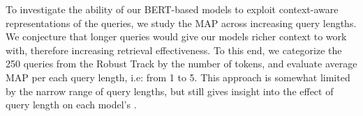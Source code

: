 \begin{table*}[b!]
\caption{}
\label{tab:results-query-length}
\end{table*}

To investigate the ability of our BERT-based models to exploit context-aware representations of the queries, we study the MAP across increasing query lengths.
We conjecture that longer queries would give our models richer context to work with, therefore increasing retrieval effectiveness.
To this end, we categorize the 250 queries from the Robust Track by the number of tokens, and evaluate average MAP per each query length, i.e: from 1 to 5.
This approach is somewhat limited by the narrow range of query lengths, but still gives insight into the effect of query length on each model's .

